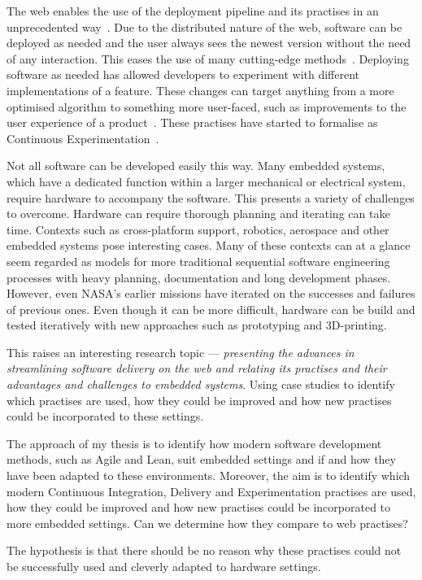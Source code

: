 \documentclass[english]{tktltiki2}
\begin{document}
The web enables the use of the deployment pipeline and its practises in an unprecedented way~\cite{KLS09}. Due to the distributed nature of the web, software can be deployed as needed and the user always sees the newest version without the need of any interaction. This eases the use of many cutting-edge methods~\cite{KLS09}. Deploying software as needed has allowed developers to experiment with different implementations of a feature. These changes can target anything from a more optimised algorithm to something more user-faced, such as improvements to the user experience of a product~\cite{KLS09}. These practises have started to formalise as Continuous Experimentation~\cite{FGM14}.

Not all software can be developed easily this way. Many embedded systems, which have a dedicated function within a larger mechanical or electrical system, require hardware to accompany the software. This presents a variety of challenges to overcome. Hardware can require thorough planning and iterating can take time. Contexts such as cross-platform support, robotics, aerospace and other embedded systems pose interesting cases. Many of these contexts can at a glance seem regarded as models for more traditional sequential software engineering processes with heavy planning, documentation and long development phases. However, even NASA’s earlier missions have iterated on the successes and failures of previous ones. Even though it can be more difficult, hardware can be build and tested iteratively with new approaches such as prototyping and 3D-printing.

This raises an interesting research topic — \emph{presenting the advances in streamlining software delivery on the web and relating its practises and their advantages and challenges to embedded systems}. Using case studies to identify which practises are used, how they could be improved and how new practises could be incorporated to these settings.

The approach of my thesis is to identify how modern software development methods, such as Agile and Lean, suit embedded settings and if and how they have been adapted to these environments. Moreover, the aim is to identify which modern Continuous Integration, Delivery and Experimentation practises are used, how they could be improved and how new practises could be incorporated to more embedded settings. Can we determine how they compare to web practises?

The hypothesis is that there should be no reason why these practises could not be successfully used and cleverly adapted to hardware settings.
\end{document}
